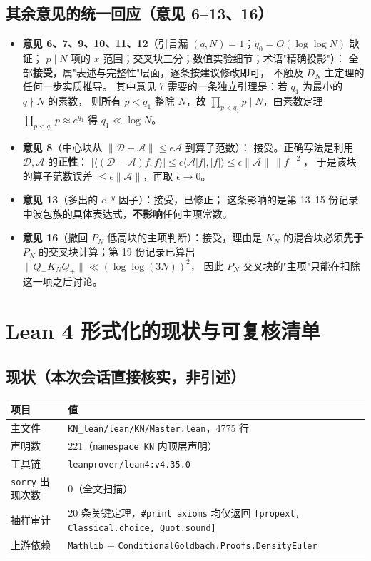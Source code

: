 \documentclass[11pt,a4paper]{ctexart}
\newcommand{\Dk}{\mathcal{D}}
\newcommand{\Ak}{\mathcal{A}}
\begin{document}
\subsection{其余意见的统一回应（意见 6--13、16）}

\begin{itemize}
\item \textbf{意见 6、7、9、10、11、12}（引言漏 $(q,N)=1$；$y_0=O(\log\log N)$ 缺证；
$p\mid N$ 项的 $x$ 范围；交叉块三分；数值实验细节；术语"精确投影"）：
全部\textbf{接受}，属"表述与完整性"层面，逐条按建议修改即可，
不触及 $D_N$ 主定理的任何一步实质推导。
其中意见 7 需要的一条独立引理是：若 $q_1$ 为最小的 $q\nmid N$ 的素数，
则所有 $p<q_1$ 整除 $N$，故 $\prod_{p<q_1}p\mid N$，由素数定理 $\prod_{p<q_1}p\approx e^{q_1}$ 得 $q_1\ll\log N$。
\item \textbf{意见 8}（中心块从 $\|\Dk-\Ak\|\le\epsilon\Ak$ 到算子范数）：
接受。正确写法是利用 $\Dk,\Ak$ 的\textbf{正性}：
$\bigl|\langle(\Dk-\Ak)f,f\rangle\bigr|\le\epsilon\langle\Ak|f|,|f|\rangle\le\epsilon\|\Ak\|\,\|f\|^2$，
于是该块的算子范数误差 $\le\epsilon\|\Ak\|$，再取 $\epsilon\to0$。
\item \textbf{意见 13}（多出的 $e^{-y}$ 因子）：接受，已修正；
这条影响的是第 13--15 份记录中波包族的具体表达式，\textbf{不影响}任何主项常数。
\item \textbf{意见 16}（撤回 $P_N$ 低高块的主项判断）：接受，理由是 $K_N$ 的混合块必须\textbf{先于}
$P_N$ 的交叉块计算；第 19 份记录已算出 $\|Q_-K_NQ_+\|\ll(\log\log(3N))^2$，
因此 $P_N$ 交叉块的"主项"只能在扣除这一项之后讨论。
\end{itemize}

\section{Lean 4 形式化的现状与可复核清单}\label{sec:lean}

\subsection{现状（本次会话直接核实，非引述）}

\begin{center}
\begin{tabular}{@{}ll@{}}
\toprule
项目 & 值 \\
\midrule
主文件 & \texttt{KN\_lean/lean/KN/Master.lean}，4775 行 \\
声明数 & 221（\texttt{namespace KN} 内顶层声明） \\
工具链 & \texttt{leanprover/lean4:v4.35.0} \\
\texttt{sorry} 出现次数 & 0（全文扫描） \\
抽样审计 & 20 条关键定理，\texttt{\#print axioms} 均仅返回
\texttt{[propext, Classical.choice, Quot.sound]} \\
上游依赖 & \texttt{Mathlib} + \texttt{ConditionalGoldbach.Proofs.DensityEuler} \\
\bottomrule
\end{tabular}
\end{center}
\end{document}
